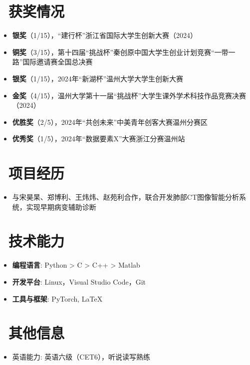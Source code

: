 \documentclass{resume}
\begin{document}
\section{\faTrophy\ 获奖情况}
\begin{itemize}
  \item \textbf{银奖}（1/15），“建行杯”浙江省国际大学生创新大赛（2024）
  \item \textbf{铜奖}（3/15），第十四届“挑战杯”秦创原中国大学生创业计划竞赛“一带一路”国际邀请赛全国总决赛
  \item \textbf{银奖}（1/15），2024年“新湖杯”温州大学大学生创新大赛
  \item \textbf{金奖}（4/15），温州大学第十一届“挑战杯”大学生课外学术科技作品竞赛决赛（2024）
  \item \textbf{优胜奖}（2/5），2024年“共创未来”中美青年创客大赛温州分赛区
  \item \textbf{优秀奖}（1/5），2024年“数据要素X”大赛浙江分赛温州站
\end{itemize}

\section{\faUsers\ 项目经历}
\begin{itemize}
  \item 与宋昊杲、郑博利、王炜炜、赵苑利合作，联合开发肺部CT图像智能分析系统，实现早期病变辅助诊断
\end{itemize}

\section{\faCogs\ 技术能力}
\begin{itemize}[parsep=0.5ex]
  \item \textbf{编程语言}: Python > C > C++ > Matlab
  \item \textbf{开发平台}: Linux，Visual Studio Code，Git
  \item \textbf{工具与框架}: PyTorch, LaTeX
\end{itemize}

\section{\faHeartO\ 其他信息}
\begin{itemize}[parsep=0.5ex]
  \item 英语能力: 英语六级（CET6），听说读写熟练
\end{itemize}
\end{document}
